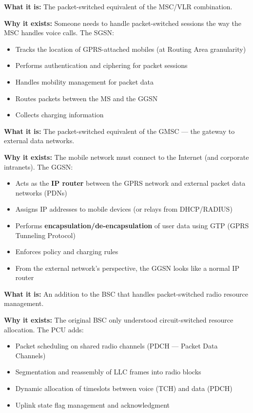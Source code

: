 \textbf{What it is:} The packet-switched equivalent of the MSC/\allowbreak{}VLR combination.

\textbf{Why it exists:} Someone needs to handle packet-switched sessions the way the MSC handles voice calls. The SGSN:

\begin{itemize}
\tightlist
\item
  Tracks the location of GPRS-attached mobiles (at Routing Area granularity)
\item
  Performs authentication and ciphering for packet sessions
\item
  Handles mobility management for packet data
\item
  Routes packets between the MS and the GGSN
\item
  Collects charging information
\end{itemize}


\textbf{What it is:} The packet-switched equivalent of the GMSC — the gateway to external data networks.

\textbf{Why it exists:} The mobile network must connect to the Internet (and corporate intranets). The GGSN:

\begin{itemize}
\tightlist
\item
  Acts as the \textbf{IP router} between the GPRS network and external packet data networks (PDNs)
\item
  Assigns IP addresses to mobile devices (or relays from DHCP/\allowbreak{}RADIUS)
\item
  Performs \textbf{encapsulation/\allowbreak{}de-encapsulation} of user data using GTP (GPRS Tunneling Protocol)
\item
  Enforces policy and charging rules
\item
  From the external network’s perspective, the GGSN looks like a normal IP router
\end{itemize}


\textbf{What it is:} An addition to the BSC that handles packet-switched radio resource management.

\textbf{Why it exists:} The original BSC only understood circuit-switched resource allocation. The PCU adds:

\begin{itemize}
\tightlist
\item
  Packet scheduling on shared radio channels (PDCH — Packet Data Channels)
\item
  Segmentation and reassembly of LLC frames into radio blocks
\item
  Dynamic allocation of timeslots between voice (TCH) and data (PDCH)
\item
  Uplink state flag management and acknowledgment
\end{itemize}

